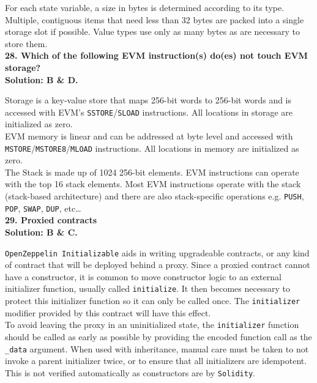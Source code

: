 For each state variable, a size in bytes is determined according to its type.
Multiple, contiguous items that need less than 32 bytes are packed into a single storage slot if possible.
Value types use only as many bytes as are necessary to store them.\\

\textbf{28. Which of the following EVM instruction(s) do(es) not touch EVM storage?}\label{sec:exam3_q28}\\

\textbf{Solution: B \& D.}

Storage is a key-value store that maps 256-bit words to 256-bit words and is accessed with EVM's \verb|SSTORE|/\verb|SLOAD| instructions.
All locations in storage are initialized as zero.\\

EVM memory is linear and can be addressed at byte level and accessed with \verb|MSTORE|/\verb|MSTORE8|/\verb|MLOAD| instructions.
All locations in memory are initialized as zero.\\

The Stack is made up of 1024 256-bit elements. EVM instructions can operate with the top 16 stack elements.
Most EVM instructions operate with the stack (stack-based architecture) and there are also stack-specific operations e.g. \verb|PUSH|, \verb|POP|, \verb|SWAP|, \verb|DUP|, etc\dots\\

\textbf{29. Proxied contracts}\label{sec:exam3_q29}\\

\textbf{Solution: B \& C.}

\verb|OpenZeppelin Initializable| aids in writing upgradeable contracts, or any kind of contract that will be deployed behind a proxy.
Since a proxied contract cannot have a constructor, it is common to move constructor logic to an external initializer function, usually called \verb|initialize|.
It then becomes necessary to protect this initializer function so it can only be called once.
The \verb|initializer| modifier provided by this contract will have this effect.\\

To avoid leaving the proxy in an uninitialized state, the \verb|initializer| function should be called as early as possible by providing the encoded function call as the \verb|_data| argument.
When used with inheritance, manual care must be taken to not invoke a parent initializer twice, or to ensure that all initializers are idempotent.
This is not verified automatically as constructors are by \verb|Solidity|.\\

